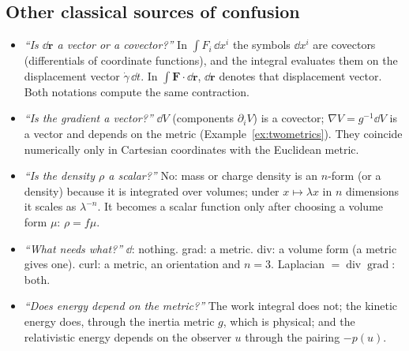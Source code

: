 \subsection{Other classical sources of confusion}\label{sec:phys-confusion}

\begin{itemize}
\item \emph{``Is $\dd\mathbf r$ a vector or a covector?''} In $\int F_i\,\dd x^i$ the symbols $\dd x^i$ are covectors (differentials of coordinate functions), and the integral evaluates them on the displacement vector $\dot\gamma\,\dd t$. In $\int\mathbf F\cdot\dd\mathbf r$, $\dd\mathbf r$ denotes that displacement vector. Both notations compute the same contraction.
\item \emph{``Is the gradient a vector?''} $\dd V$ (components $\partial_iV$) is a covector; $\nabla V=g^{-1}\dd V$ is a vector and depends on the metric (Example~\ref{ex:twometrics}). They coincide numerically only in Cartesian coordinates with the Euclidean metric.
\item \emph{``Is the density $\rho$ a scalar?''} No: mass or charge density is an $n$-form (or a density) because it is integrated over volumes; under $x\mapsto\lambda x$ in $n$ dimensions it scales as $\lambda^{-n}$. It becomes a scalar function only after choosing a volume form $\mu$: $\rho=f\mu$.
\item \emph{``What needs what?''} $\dd$: nothing. grad: a metric. div: a volume form (a metric gives one). curl: a metric, an orientation and $n=3$. Laplacian $=\operatorname{div}\operatorname{grad}$: both.
\item \emph{``Does energy depend on the metric?''} The work integral does not; the kinetic energy does, through the inertia metric $g$, which is physical; and the relativistic energy depends on the observer $u$ through the pairing $-p(u)$.
\end{itemize}
